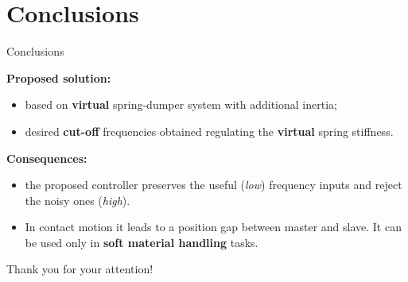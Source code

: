 \documentclass[10pt]{beamer}
\begin{document}
\section{Conclusions}

\begin{frame}{Conclusions}

  \textbf{Proposed solution:} 
  \begin{itemize}
  \item based on \textbf{virtual} spring-dumper system with additional inertia;
  \item desired \textbf{cut-off} frequencies obtained regulating the \textbf{virtual} spring stiffness.
  \end{itemize}

  \textbf{Consequences:} 
  \begin{itemize}
  \item the proposed controller preserves the useful (\textsl{low}) frequency inputs and reject the noisy ones (\textsl{high}). 
  \item In contact motion it leads to a position gap between master and slave. It can be used only in \textbf{soft material handling} tasks.
  \end{itemize}
\end{frame}

{
\begin{frame}[standout]
Thank you for your attention!
\end{frame}
}

\appendix
\end{document}
